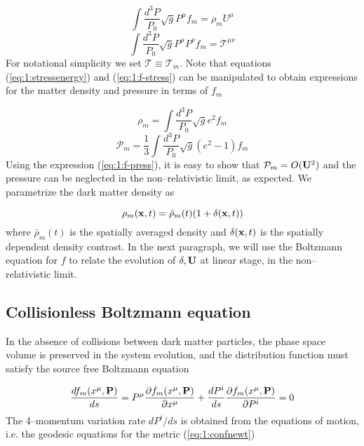 \begin{equation}
\label{eq:1:f-velocity}
\int \frac{d^3 P}{P_0}\sqrt{g} P^\mu f_m = \rho_m U^\mu 
\end{equation}
%
\begin{equation}
\label{eq:1:f-stress}
\int \frac{d^3 P}{P_0}\sqrt{g} P^\mu P^\nu f_m = \mathcal{T}^{\mu\nu} 
\end{equation}
%
For notational simplicity we set $\mathcal{T}\equiv \mathcal{T}_m$. Note that equations (\ref{eq:1:stressenergy}) and (\ref{eq:1:f-stress}) can be manipulated to obtain expressions for the matter density and pressure in terms of $f_m$

\begin{equation}
\label{eq:1:f-rho}
\rho_m = \int \frac{d^3 P}{P_0}\sqrt{g}e^2 f_m
\end{equation}
%
\begin{equation}
\label{eq:1:f-press}
\mathcal{P}_m = \frac{1}{3}\int \frac{d^3 P}{P_0}\sqrt{g}(e^2-1) f_m
\end{equation}
%
Using the expression (\ref{eq:1:f-press}), it is easy to show that $\mathcal{P}_m = O(\mathbf{U}^2)$ and the pressure can be neglected in the non--relativistic limit, as expected. 
We parametrize the dark matter density as 

\begin{equation}
\label{eq:1:matter-rho}
\rho_m(\mathbf{x},t) = \bar{\rho}_m(t)(1+\delta(\mathbf{x},t))
\end{equation}
%
where $\bar{\rho}_m(t)$ is the spatially averaged density and $\delta(\mathbf{x},t)$ is the spatially dependent density contrast. In the next paragraph, we will use the Boltzmann equation for $f$ to relate the evolution of $\delta,\mathbf{U}$ at linear stage, in the non--relativistic limit.      

\subsection{Collisionless Boltzmann equation}
In the absence of collisions between dark matter particles, the phase space volume is preserved in the system evolution, and the distribution function must satisfy the source free Boltzmann equation 

\begin{equation}
\label{eq:1:boltzmann}
\frac{df_m(x^\mu,\mathbf{P})}{ds} = P^\mu\frac{\partial f_m(x^\mu,\mathbf{P})}{\partial x^\mu} + \frac{d P^i}{ds}\frac{\partial f_m(x^\mu,\mathbf{P})}{\partial P^i} = 0
\end{equation}
%
The 4--momentum variation rate $dP^i/ds$ is obtained from the equations of motion, i.e. the geodesic equations for the metric (\ref{eq:1:confnewt})

